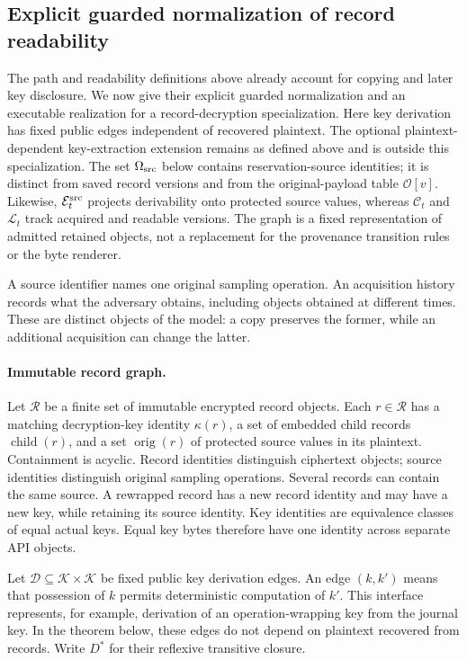 \subsection{Explicit guarded normalization of record readability}
\label{sec:guarded-provenance}

The path and readability definitions above already account for copying and
later key disclosure. We now give their explicit guarded normalization and
an executable realization for a record-decryption specialization. Here key
derivation has fixed public edges independent of recovered plaintext. The
optional plaintext-dependent key-extraction extension remains as defined
above and is outside this specialization. The set $\Omega_{\rm src}$ below
contains reservation-source identities; it is distinct from saved record
versions and from the original-payload table $\mathcal O[v]$. Likewise,
$\mathcal E^{\rm src}_t$ projects derivability onto protected source values,
whereas $\mathcal C_t$ and $\mathcal L_t$ track acquired and readable versions.
The graph is a fixed representation of admitted retained objects, not a
replacement for the provenance transition rules or the byte renderer.


A source identifier names one original sampling operation.  An acquisition
history records what the adversary obtains, including objects obtained at
different times.  These are distinct objects of the model: a copy preserves
the former, while an additional acquisition can change the latter.

\paragraph{Immutable record graph.}
Let $\mathcal R$ be a finite set of immutable encrypted record objects.
Each $r\in\mathcal R$ has a matching decryption-key identity $\kappa(r)$,
a set of embedded child records $\operatorname{child}(r)$, and a set
$\operatorname{orig}(r)$ of protected source values in its plaintext.
Containment is acyclic.  Record identities distinguish ciphertext objects;
source identities distinguish original sampling operations.  Several
records can contain the same source.  A rewrapped record has a new record
identity and may have a new key, while retaining its source identity.
Key identities are equivalence classes of equal actual keys. Equal key bytes
therefore have one identity across separate API objects.

Let $\mathcal D\subseteq\mathcal K\times\mathcal K$ be fixed public key
derivation edges.  An edge $(k,k')$ means that possession of $k$ permits
deterministic computation of $k'$.  This interface represents, for example,
derivation of an operation-wrapping key from the journal key.  In the
theorem below, these edges do not depend on plaintext recovered from records.
Write $D^*$ for their reflexive transitive closure.

